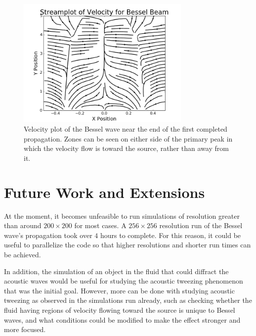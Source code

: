 \documentclass{article}
\begin{document}
  \begin{figure}
     \centering
     \includegraphics[width=0.75\textwidth]{bess2.png}
     \caption{Velocity plot of the Bessel wave near the end of the first completed propagation. Zones can be seen on either side of the primary peak in which the velocity flow is toward the source, rather than away from it.}
     \label{f:bess2}
 \end{figure}
\section{Future Work and Extensions}
At the moment, it becomes unfeasible to run simulations of resolution greater than around $200 \times 200$ for most cases. A $256 \times 256$ resolution run of the Bessel wave's propagation took over $4$ hours to complete. For this reason, it could be useful to parallelize the code so that higher resolutions and shorter run times can be achieved.

In addition, the simulation of an object in the fluid that could diffract the acoustic waves would be useful for studying the acoustic tweezing phenomenon that was the initial goal. However, more can be done with studying acoustic tweezing as observed in the simulations run already, such as checking whether the fluid having regions of velocity flowing toward the source is unique to Bessel waves, and what conditions could be modified to make the effect stronger and more focused. 
\end{document}
